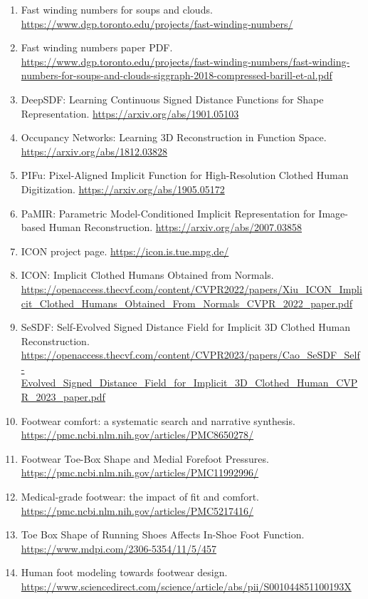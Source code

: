 \documentclass[
  10.5pt,
]{article}
\begin{document}
\begin{enumerate}
  Generalized winding numbers.
  \url{https://dl.acm.org/doi/10.1145/2461912.2461916}
\item
  Fast winding numbers for soups and clouds.
  \url{https://www.dgp.toronto.edu/projects/fast-winding-numbers/}
\item
  Fast winding numbers paper PDF.
  \url{https://www.dgp.toronto.edu/projects/fast-winding-numbers/fast-winding-numbers-for-soups-and-clouds-siggraph-2018-compressed-barill-et-al.pdf}
\item
  DeepSDF: Learning Continuous Signed Distance Functions for Shape
  Representation. \url{https://arxiv.org/abs/1901.05103}
\item
  Occupancy Networks: Learning 3D Reconstruction in Function Space.
  \url{https://arxiv.org/abs/1812.03828}
\item
  PIFu: Pixel-Aligned Implicit Function for High-Resolution Clothed
  Human Digitization. \url{https://arxiv.org/abs/1905.05172}
\item
  PaMIR: Parametric Model-Conditioned Implicit Representation for
  Image-based Human Reconstruction.
  \url{https://arxiv.org/abs/2007.03858}
\item
  ICON project page. \url{https://icon.is.tue.mpg.de/}
\item
  ICON: Implicit Clothed Humans Obtained from Normals.
  \url{https://openaccess.thecvf.com/content/CVPR2022/papers/Xiu_ICON_Implicit_Clothed_Humans_Obtained_From_Normals_CVPR_2022_paper.pdf}
\item
  SeSDF: Self-Evolved Signed Distance Field for Implicit 3D Clothed
  Human Reconstruction.
  \url{https://openaccess.thecvf.com/content/CVPR2023/papers/Cao_SeSDF_Self-Evolved_Signed_Distance_Field_for_Implicit_3D_Clothed_Human_CVPR_2023_paper.pdf}
\item
  Footwear comfort: a systematic search and narrative synthesis.
  \url{https://pmc.ncbi.nlm.nih.gov/articles/PMC8650278/}
\item
  Footwear Toe-Box Shape and Medial Forefoot Pressures.
  \url{https://pmc.ncbi.nlm.nih.gov/articles/PMC11992996/}
\item
  Medical-grade footwear: the impact of fit and comfort.
  \url{https://pmc.ncbi.nlm.nih.gov/articles/PMC5217416/}
\item
  Toe Box Shape of Running Shoes Affects In-Shoe Foot Function.
  \url{https://www.mdpi.com/2306-5354/11/5/457}
\item
  Human foot modeling towards footwear design.
  \url{https://www.sciencedirect.com/science/article/abs/pii/S001044851100193X}

\end{enumerate}
\end{document}
